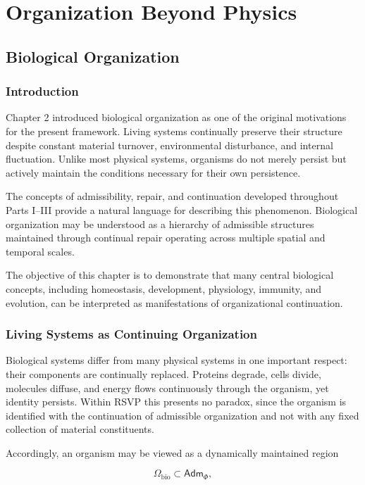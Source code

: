 \documentclass[11pt,oneside]{book}
\numberwithin{equation}{chapter}
\theoremstyle{definition}
\theoremstyle{plain}
\newcommand{\Adm}{\mathsf{Adm}}
\begin{document}
\part{Organization Beyond Physics}


\chapter{Biological Organization}

\section{Introduction}

Chapter 2 introduced biological organization as one of the original
motivations for the present framework. Living systems continually preserve
their structure despite constant material turnover, environmental
disturbance, and internal fluctuation. Unlike most physical systems,
organisms do not merely persist but actively maintain the conditions
necessary for their own persistence.

The concepts of admissibility, repair, and continuation developed throughout
Parts I--III provide a natural language for describing this phenomenon.
Biological organization may be understood as a hierarchy of admissible
structures maintained through continual repair operating across multiple
spatial and temporal scales.

The objective of this chapter is to demonstrate that many central biological
concepts, including homeostasis, development, physiology, immunity, and
evolution, can be interpreted as manifestations of organizational
continuation.

\section{Living Systems as Continuing Organization}

Biological systems differ from many physical systems in one important respect: their components are continually replaced. Proteins degrade, cells divide, molecules diffuse, and energy flows continuously through the organism, yet identity persists. Within RSVP this presents no paradox, since the organism is identified with the continuation of admissible organization and not with any fixed collection of material constituents.

Accordingly, an organism may be viewed as a dynamically maintained region

\[
\Omega_{\mathrm{bio}}
\subset
\Adm_\Phi,
\]
\end{document}
